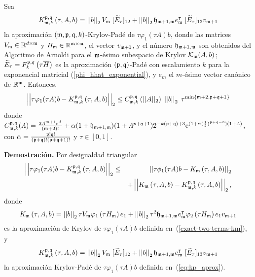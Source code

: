 \begin{theorem}\cite{naranjo2021locally}\label{theorem:Krylov-bound}
	Sea
	\begin{equation} \label{eq:gen_kp_aprox}
	K_{\mathfrak{m},k}^{\mathfrak{p},\mathfrak{q}}\left(\tau, A , b \right)=\left\lvert \left\lvert b \right\rvert \right\rvert_2 V_{\mathfrak{m}}\;[\widetilde{E}_{\tau}]_{12} + \left\lvert \left\lvert b \right\rvert \right\rvert_2 \mathfrak{h}_{\mathfrak{m}+1,\mathfrak{m}}e_{\mathfrak{m}}^\intercal\;[\widetilde{E}_{\tau}]_{13} v_{\mathfrak{m}+1}
	\end{equation}
	la aproximación $(\mathfrak{m} , \mathfrak{p} ,\mathfrak{q} , k)$-Krylov-Padé de $\tau \varphi_1(\tau A)b$, donde las matrices $V_{\mathfrak{m}}\in\mathbb{R}^{d\times \mathfrak{m}}$ y $H_{\mathfrak{m}}\in\mathbb{R}^{{\mathfrak{m}} \times {\mathfrak{m}}}$, el vector $v_{\mathfrak{m}+1}$, y el número $\mathfrak{h}_{\mathfrak{m}+1,\mathfrak{m}}$ son obtenidos del Algoritmo de Arnoldi para el $\mathfrak{m}$-ésimo subespacio de Krylov $\mathcal{K}_{\mathfrak{m}}(A,b)$;  $\widetilde{E}_{\tau}=F_k^{\mathfrak{p},\mathfrak{q}}\left(\tau\overline{H}\right)$ es la aproximación $(\mathfrak{p},\mathfrak{q})$-Padé con escalamiento $k$ para la exponencial matricial (\ref{phi_hhat_exponential}), y $e_m$ el $m$-ésimo vector canónico de $\mathbb{R}^{\mathfrak{m}}$.
	Entonces,
	\begin{equation}
	\left\lvert\left\lvert  \tau \varphi_1(\tau A)b -
	K_{\mf,k}^{\pf,\qf}\left( \tau, A , b \right)\right\rvert\right\rvert_2%
	\leq C_{\mf,k}^{\pf,\qf}\left(\lvert\lvert A \rvert\rvert_2\right) \;
	\nnorm{\nnorm{b}}_2 \; \tau^{\mathrm{min}\left\{ \mf+2,\pf+\qf+1 \right\}}
	\end{equation}
	donde $C_{\mathfrak{m},k}^{\mathfrak{p},\mathfrak{q}}(\varLambda)= \frac{2 \varLambda^{m+1} \mathrm{e}^{\varLambda}}{(\mathfrak{m}+2)!}+
	\alpha (1+\mathfrak{h}_{\mathfrak{m}+1,\mathfrak{m}}) (1+\varLambda^{p+q+1}) 2^{-k(\mathfrak{p}+\mathfrak{q})+3}\mathrm{e}^{(1+\alpha(\frac{1}{2})^{\mathfrak{p}+\mathfrak{q}-3})(1+\varLambda)} $,
	con $\alpha=\frac{\mathfrak{p}!\mathfrak{q}!}{(\mathfrak{p}+\mathfrak{q})!(\mathfrak{p}+\mathfrak{q}+1)!}$ y $\tau \in [0,1]$.
\end{theorem}
\textbf{Demostración.} Por desigualdad triangular
\begin{eqnarray} \label{importatdeq}
\left\lvert\left\lvert  \tau \varphi_1(\tau A)b -
K_{\mathfrak{m},k}^{\mathfrak{p},\mathfrak{q}}\left( \tau , A , b \right)\right\rvert\right\rvert_2
& \leq & \left\lvert\left\lvert \tau \phi_1(\tau A)b -  K_{\mathfrak{m}}\left( \tau , A , b \right) \right\rvert\right\rvert_2 \\
& & + \left\lvert\left\lvert  K_{\mathfrak{m}}\left( \tau , A , b \right) -
K_{\mathfrak{m},k}^{\mathfrak{p},\mathfrak{q}}\left( \tau, A , b \right)\right\rvert\right\rvert_2, \nonumber
\end{eqnarray}
donde
\begin{equation*}
K_{\mathfrak{m}}\left(\tau,A , b \right)=\left\lvert \left\lvert b \right\rvert \right\rvert_2 \tau V_{\mathfrak{m}}\varphi_1\left( \tau H_{\mathfrak{m}} \right) e_1 + \left\lvert \left\lvert b \right\rvert \right\rvert_2 \tau^{2}\mathfrak{h}_{\mathfrak{m}+1,\mathfrak{m}}e_{\mathfrak{m}}^\intercal\varphi_2\left(\tau H_{\mathfrak{m}}\right) e_1 v_{\mathfrak{m}+1}
\end{equation*}
es la aproximación de Krylov de $\tau \varphi_1(\tau A)b$ definida en~(\ref{exact-two-terms-km}), y
\begin{equation*}
K_{\mathfrak{m},k}^{\mathfrak{p},\mathfrak{q}}\left(\tau, A , b \right)=\left\lvert \left\lvert b \right\rvert \right\rvert_2 V_{\mathfrak{m}}\;[\widetilde{E}_{\tau}]_{12} + \left\lvert \left\lvert b \right\rvert \right\rvert_2 \mathfrak{h}_{\mathfrak{m}+1,\mathfrak{m}}e_{\mathfrak{m}}^\intercal\;[\widetilde{E}_{\tau}]_{13} v_{\mathfrak{m}+1}
\end{equation*}
la aproximación Krylov-Padé de $\tau \varphi_1(\tau A)b$ definida en~(\ref{eq:kp_aprox}).


